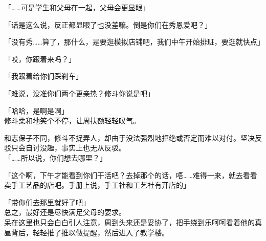 「……可是学生和父母在一起，父母会更显眼」

「话是这么说，反正都显眼了也没差嘛。倒是你们在秀恩爱吧？」

「没有秀……算了，那什么，是要逛模拟店铺吧，我们中午开始排班，要逛就快点」

「哎，你跟着来吗？」

「我跟着给你们踩刹车」

「难说，没准你们两个更亲热？修斗你说是吧」

「哈哈，是啊是啊」\\

修斗柔和地笑个不停，让周扶额轻轻叹气。

和志保子不同，修斗不捉弄人，却由于没法强烈地拒绝或否定而难以对付。坚决反驳只会自讨没趣，事实上也无从反驳。\\

「……所以说，你们想去哪里？」

「这个啊，下午才能看到你们干活吧？去掉那个的话，唔……难得一来，就去看看卖手工艺品的店吧。手册上说，手工社和工艺社有开店的」

「带你们去那里就好了吧」\\

总之，最好还是尽快满足父母的要求。\\

呆在这里也只会白白引人注意，周到头来还是妥协了，把手绕到乐呵呵看着他的真昼背后，轻轻推了推以做提醒，然后进入了教学楼。
